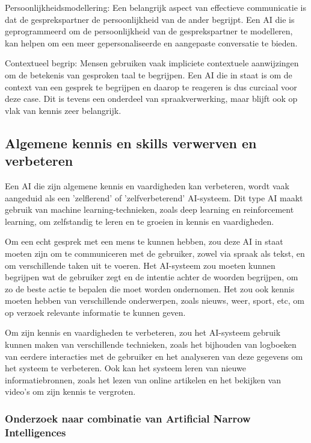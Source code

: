 Persoonlijkheidsmodellering: Een belangrijk aspect van effectieve communicatie is dat de gesprekspartner de persoonlijkheid van de ander begrijpt. Een AI die is geprogrammeerd om de persoonlijkheid van de gesprekspartner te modelleren, kan helpen om een meer gepersonaliseerde en aangepaste conversatie te bieden.

Contextueel begrip: Mensen gebruiken vaak impliciete contextuele aanwijzingen om de betekenis van gesproken taal te begrijpen. Een AI die in staat is om de context van een gesprek te begrijpen en daarop te reageren is dus curciaal voor deze case. Dit is tevens een onderdeel van spraakverwerking, maar blijft ook op vlak van kennis zeer belangrijk.

\newpage

\subsection{Algemene kennis en skills verwerven en verbeteren}

Een AI die zijn algemene kennis en vaardigheden kan verbeteren, wordt vaak aangeduid als een 'zelflerend' of 'zelfverbeterend' AI-systeem. Dit type AI maakt gebruik van machine learning-technieken, zoals deep learning en reinforcement learning, om zelfstandig te leren en te groeien in kennis en vaardigheden.

Om een echt gesprek met een mens te kunnen hebben, zou deze AI in staat moeten zijn om te communiceren met de gebruiker, zowel via spraak als tekst, en om verschillende taken uit te voeren. Het AI-systeem zou moeten kunnen begrijpen wat de gebruiker zegt en de intentie achter de woorden begrijpen, om zo de beste actie te bepalen die moet worden ondernomen. Het zou ook kennis moeten hebben van verschillende onderwerpen, zoals nieuws, weer, sport, etc, om op verzoek relevante informatie te kunnen geven.

Om zijn kennis en vaardigheden te verbeteren, zou het AI-systeem gebruik kunnen maken van verschillende technieken, zoals het bijhouden van logboeken van eerdere interacties met de gebruiker en het analyseren van deze gegevens om het systeem te verbeteren. Ook kan het systeem leren van nieuwe informatiebronnen, zoals het lezen van online artikelen en het bekijken van video's om zijn kennis te vergroten.

\subsubsection{Onderzoek naar combinatie van Artificial Narrow Intelligences}

